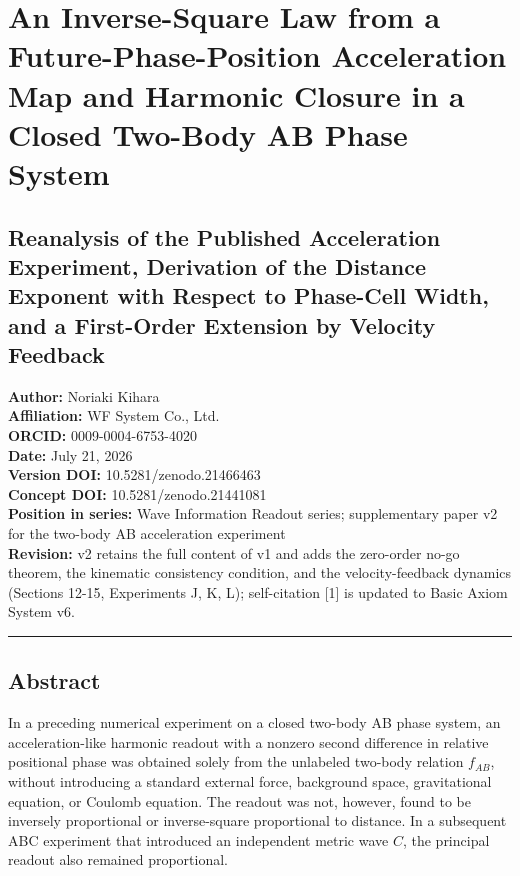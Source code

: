 \documentclass[
  a4paper,
]{article}
\author{}
\date{}
\begin{document}
\section{An Inverse-Square Law from a Future-Phase-Position Acceleration
Map and Harmonic Closure in a Closed Two-Body AB Phase
System}\label{an-inverse-square-law-from-a-future-phase-position-acceleration-map-and-harmonic-closure-in-a-closed-two-body-ab-phase-system}

\subsection{Reanalysis of the Published Acceleration Experiment,
Derivation of the Distance Exponent with Respect to Phase-Cell Width,
and a First-Order Extension by Velocity
Feedback}\label{reanalysis-of-the-published-acceleration-experiment-derivation-of-the-distance-exponent-with-respect-to-phase-cell-width-and-a-first-order-extension-by-velocity-feedback}

\textbf{Author:} Noriaki Kihara\\
\textbf{Affiliation:} WF System Co., Ltd.\\
\textbf{ORCID:} 0009-0004-6753-4020\\
\textbf{Date:} July 21, 2026\\
\textbf{Version DOI:} 10.5281/zenodo.21466463\\
\textbf{Concept DOI:} 10.5281/zenodo.21441081\\
\textbf{Position in series:} Wave Information Readout series;
supplementary paper v2 for the two-body AB acceleration experiment\\
\textbf{Revision:} v2 retains the full content of v1 and adds the
zero-order no-go theorem, the kinematic consistency condition, and the
velocity-feedback dynamics (Sections 12-15, Experiments J, K, L);
self-citation {[}1{]} is updated to Basic Axiom System v6.

\begin{center}\rule{0.5\linewidth}{0.5pt}\end{center}

\subsection{Abstract}\label{abstract}

In a preceding numerical experiment on a closed two-body AB phase
system, an acceleration-like harmonic readout with a nonzero second
difference in relative positional phase was obtained solely from the
unlabeled two-body relation \(f_{AB}\), without introducing a standard
external force, background space, gravitational equation, or Coulomb
equation. The readout was not, however, found to be inversely
proportional or inverse-square proportional to distance. In a subsequent
ABC experiment that introduced an independent metric wave \(C\), the
principal readout also remained proportional.
\end{document}
